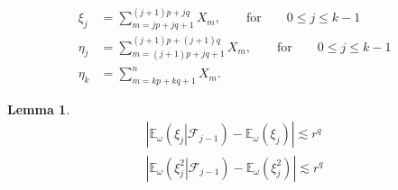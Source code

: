 \documentclass[10pt,a4paper]{amsart}
\newtheorem{lemma}{Lemma}
\newcommand{\E}{\mathbb{E}}
\newcommand{\FF}{\mathcal{F}}
\begin{document}
\begin{align}\label{def:xieta}
 \xi_j&=\sum_{m=jp+jq+1}^{(j+1)p+jq}X_m,\qquad \text{for}\qquad 0\leq j\leq k-1\\
\eta_j&=\sum_{m=(j+1)p+jq+1}^{(j+1)p+(j+1)q}X_m,\qquad \text{for}\qquad 0\leq j\leq k-1\\
\eta_k&=\sum_{m=kp+kq+1}^{n}X_m.
\end{align}

\begin{lemma}\label{lemma:DecayConditionned}
\[
 \begin{split}
 \left|\E_\omega\left(\left.
 \xi_j\right|\FF_{j-1}\right)-\E_\omega\left(
 \xi_j\right)\right|\lesssim r^{q}\\
\left| \E_\omega\left(\left.
\xi_j^2\right|\FF_{j-1}\right)-\E_\omega\left(
 \xi_j^2\right)\right|\lesssim r^{q}
  \end{split}
\]
\end{lemma}
\end{document}
